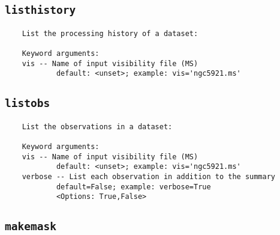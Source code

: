 \subsection{{\tt listhistory}}
\label{section:tasks.listhistory}

\small
\begin{verbatim}
    List the processing history of a dataset:
    
    Keyword arguments:
    vis -- Name of input visibility file (MS)
            default: <unset>; example: vis='ngc5921.ms'
\end{verbatim}
\normalsize


\subsection{{\tt listobs}}
\label{section:tasks.listobs}

\small
\begin{verbatim}
    List the observations in a dataset:
    
    Keyword arguments:
    vis -- Name of input visibility file (MS)
            default: <unset>; example: vis='ngc5921.ms'
    verbose -- List each observation in addition to the summary
            default=False; example: verbose=True
            <Options: True,False>
\end{verbatim}
\normalsize


\subsection{{\tt makemask}}
\label{section:tasks.makemask}

